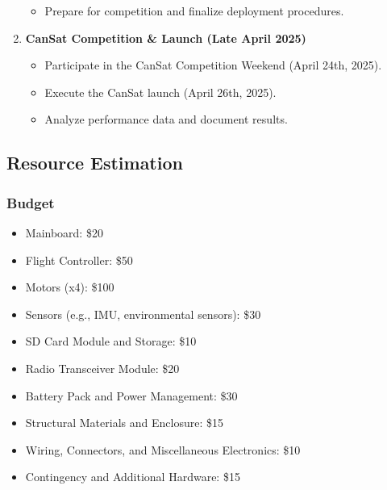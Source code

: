 \documentclass{article}
\begin{document}
\begin{enumerate}
\begin{itemize}
        \item Prepare for competition and finalize deployment procedures.
    \end{itemize}
    \item \textbf{CanSat Competition \& Launch (Late April 2025)}
    \begin{itemize}
        \item Participate in the CanSat Competition Weekend (April 24th, 2025).
        \item Execute the CanSat launch (April 26th, 2025).
        \item Analyze performance data and document results.
    \end{itemize}
\end{enumerate}

\subsection{Resource Estimation}

\subsubsection{Budget}
\begin{itemize}
    \item Mainboard: \$20
    \item Flight Controller: \$50
    \item Motors (x4): \$100
    \item Sensors (e.g., IMU, environmental sensors): \$30
    \item SD Card Module and Storage: \$10
    \item Radio Transceiver Module: \$20
    \item Battery Pack and Power Management: \$30
    \item Structural Materials and Enclosure: \$15
    \item Wiring, Connectors, and Miscellaneous Electronics: \$10
    \item Contingency and Additional Hardware: \$15
\end{itemize}
\end{document}
